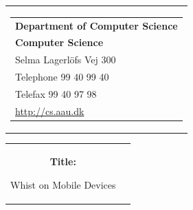 \thispagestyle{empty}
\begin{titlepage}
\begin{nopagebreak}
{\samepage 
\begin{tabular}{r}
\parbox{\textwidth}{  
\hfill \parbox{5.9cm}{\begin{tabular}{l}
{\sf\small \textbf{Department of Computer Science}}\\
{\sf\small  \textbf{Computer Science}} \\
{\sf\small Selma Lagerl\"{o}fs Vej 300} \\
{\sf\small Telephone 99 40 99 40} \\
{\sf\small Telefax 99 40 97 98} \\
{\sf\small \url{http://cs.aau.dk}}
\end{tabular}}}
\\
\end{tabular}

\begin{tabular}{cc}
\parbox{7cm}{
\begin{description}

\item {\bf Title:} 

Whist on Mobile Devices

\end{description}

\parbox{8cm}{

}}
\end{tabular}}
\end{nopagebreak}
\end{titlepage}

